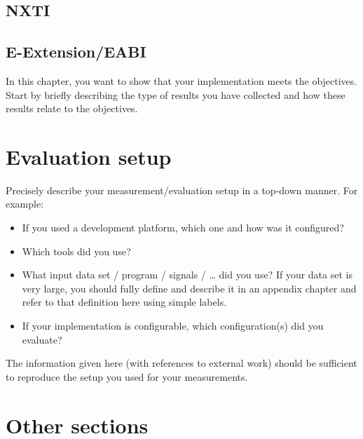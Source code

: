 \subsection{NXTI}

\subsection{E-Extension/EABI}


























In this chapter, you want to show that your implementation meets the objectives.
Start by briefly describing the type of results you have collected and how these results relate to the objectives.

\section{Evaluation setup}

Precisely describe your measurement/evaluation setup in a top-down manner.
For example:
\begin{itemize}
  \item If you used a development platform, which one and how was it configured?
  \item Which tools did you use?
  \item What input data set / program / signals / \ldots{} did you use?
    If your data set is very large, you should fully define and describe it in an appendix chapter and refer to that definition here using simple labels.
  \item If your implementation is configurable, which configuration(s) did you evaluate?
\end{itemize}

The information given here (with references to external work) should be sufficient to reproduce the setup you used for your measurements.

\section{Other sections}

